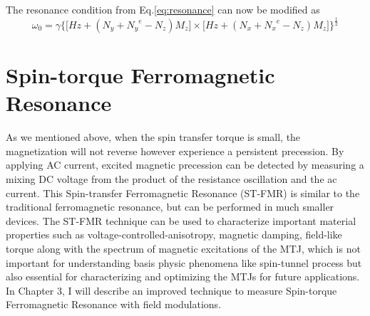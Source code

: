 The resonance condition from Eq.\ref{eq:resonance} can now be modified as 
\begin{equation}
    \label{eq:resonanceKu}
    \omega_0 = \gamma \big\{ \big[Hz+(N_y + {N_y}^e - N_z)M_z] \times \big[Hz+(N_x + {N_x}^e - N_z)M_z]          \big\}^\frac{1}{2}
\end{equation}





\section{Spin-torque Ferromagnetic Resonance}

As we mentioned above, when the spin transfer torque is small, the magnetization will not reverse however experience a persistent precession. By applying AC current, excited magnetic precession can be detected by measuring a mixing DC voltage from the product of the resistance oscillation and the ac current. This Spin-transfer Ferromagnetic Resonance (ST-FMR) \cite{Sankey2006}\cite{Tulapurkar2005} is similar to the traditional ferromagnetic resonance, but can be performed in much smaller devices. The ST-FMR technique can be used to characterize important material properties such as voltage-controlled-anisotropy\cite{VCMA1}\cite{Jian}\cite{Wang2012}, magnetic damping\cite{PRLdamping}, field-like torque\cite{Sankey2008} along with the spectrum of magnetic excitations of the MTJ\cite{excitation1}\cite{excitation2}, which is not important for understanding basis physic phenomena like spin-tunnel process but also essential for characterizing and optimizing the MTJs for future applications. In Chapter 3, I will describe an improved technique to measure Spin-torque Ferromagnetic Resonance with field modulations.








